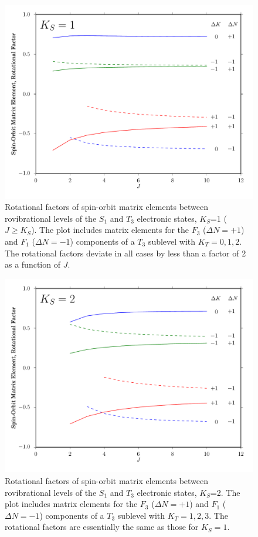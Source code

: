 \begin{figure}[p]
  \caption{Rotational factors of spin-orbit matrix elements between
    rovibrational levels of the $S_1$ and $T_3$ electronic states,
    $K_S$=1 ($J \ge K_S$).  The plot includes matrix elements for the
    $F_3$ ($\Delta N = +1$) and $F_1$ ($\Delta N = -1$) components of
    a $T_3$ sublevel with $K_T=0,1,2$.  The rotational factors deviate
    in all cases by less than a factor of 2 as a function of $J$.}
  \label{fig:rotational-factors-1}
  \centering
  \includegraphics[width=6in]{rotational-factors-k1.pdf}
\end{figure}

\begin{figure}[p]
  \caption{Rotational factors of spin-orbit matrix elements between
    rovibrational levels of the $S_1$ and $T_3$ electronic states,
    $K_S$=2.  The plot includes matrix elements for the $F_3$ ($\Delta
    N = +1$) and $F_1$ ($\Delta N = -1$) components of a $T_3$
    sublevel with $K_T=1,2,3$.  The rotational factors are essentially
    the same as those for $K_S=1$.}
  \label{fig:rotational-factors-2}
  \centering
  \includegraphics[width=6in]{rotational-factors-k2.pdf}
\end{figure}


